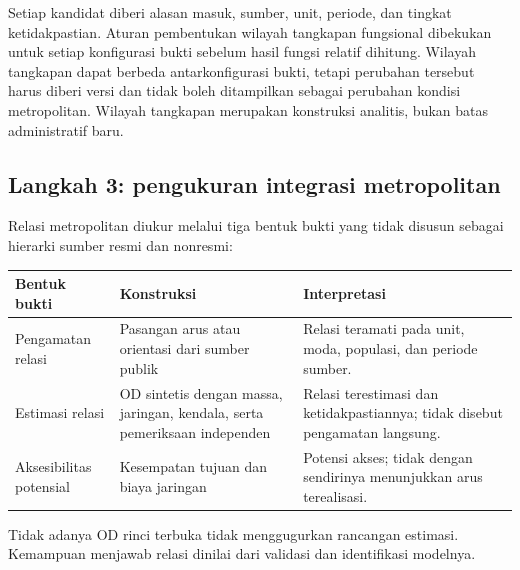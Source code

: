 \documentclass[11pt,a4paper,oneside,openany,indonesian]{report}
\begin{document}
Setiap kandidat diberi alasan masuk, sumber, unit, periode, dan tingkat
ketidakpastian. Aturan pembentukan wilayah tangkapan fungsional
dibekukan untuk setiap konfigurasi bukti sebelum hasil fungsi relatif
dihitung. Wilayah tangkapan dapat berbeda antarkonfigurasi bukti, tetapi
perubahan tersebut harus diberi versi dan tidak boleh ditampilkan
sebagai perubahan kondisi metropolitan. Wilayah tangkapan merupakan
konstruksi analitis, bukan batas administratif baru.

\subsection{Langkah 3: pengukuran integrasi
metropolitan}\label{langkah-3-pengukuran-integrasi-metropolitan}

Relasi metropolitan diukur melalui tiga bentuk bukti yang tidak disusun
sebagai hierarki sumber resmi dan nonresmi:

{\def\LTcaptype{none} %
\begin{longtable}[]{@{}
  >{\raggedright\arraybackslash}p{}
  >{\raggedright\arraybackslash}p{}
  >{\raggedright\arraybackslash}p{}@{}}
\toprule\noalign{}
\begin{minipage}[b]{\linewidth}\raggedright
Bentuk bukti
\end{minipage} & \begin{minipage}[b]{\linewidth}\raggedright
Konstruksi
\end{minipage} & \begin{minipage}[b]{\linewidth}\raggedright
Interpretasi
\end{minipage} \\
\midrule\noalign{}
\endhead
\bottomrule\noalign{}
\endlastfoot
Pengamatan relasi & Pasangan arus atau orientasi dari sumber publik &
Relasi teramati pada unit, moda, populasi, dan periode sumber. \\
Estimasi relasi & OD sintetis dengan massa, jaringan, kendala, serta
pemeriksaan independen & Relasi terestimasi dan ketidakpastiannya; tidak
disebut pengamatan langsung. \\
Aksesibilitas potensial & Kesempatan tujuan dan biaya jaringan & Potensi
akses; tidak dengan sendirinya menunjukkan arus terealisasi. \\
\end{longtable}
}

Tidak adanya OD rinci terbuka tidak menggugurkan rancangan estimasi.
Kemampuan menjawab relasi dinilai dari validasi dan identifikasi
modelnya.
\end{document}
